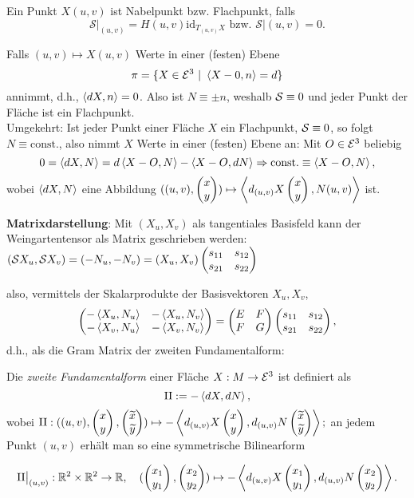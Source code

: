 \begin{remark}
	
	Ein Punkt $X(u,v)$ ist Nabelpunkt bzw. Flachpunkt, falls
	\[ \mathcal{S}\big|_{(u,v)} = H(u,v)\mathrm{id}_{T_{(u,v)}X} \text{ bzw. } \mathcal{S}\big|{(u,v)}=0. \]
	
\end{remark}

\begin{example}\label{Ex:Flachpunkt}
	
	Falls $  (u,v) \mapsto X(u,v) $ Werte in einer (festen) Ebene
		\[ \pi = \{ X \in \mathcal E^3 ~|~ \left \langle X-0,n \right\rangle = d \} \] 
	annimmt, d.h., $ \left \langle dX,n \right\rangle=0 $. Also ist $ N \equiv \pm n $, weshalb $\mathcal S \equiv 0$ und jeder Punkt der Fläche ist ein Flachpunkt.\\
	Umgekehrt: Ist jeder Punkt einer Fläche $ X $ ein Flachpunkt, $ \mathcal S \equiv 0 $, so folgt $ N \equiv \mathrm{const.} $, also nimmt $ X $ Werte in einer (festen) Ebene an: Mit $ O \in \mathcal E^3 $ beliebig \[ 0 = \left \langle dX,N \right\rangle = d\left \langle X-O,N \right\rangle - \left \langle X-O,dN \right\rangle \Rightarrow \mathrm{const.} \equiv \left \langle X-O,N \right\rangle, \] wobei $ \left \langle dX,N \right\rangle $ eine Abbildung $ ((u,v), \begin{pmatrix} x \\ y \end{pmatrix}) \mapsto \left \langle d_{(u,v)}X\begin{pmatrix} x\\y \end{pmatrix},N(u,v) \right\rangle $ ist.

	\textbf{Matrixdarstellung}: Mit $(X_u,X_v)$ als tangentiales Basisfeld kann der Weingartentensor als Matrix geschrieben werden:
	$ (\mathcal S X_u, \mathcal S X_v) = (-N_u, -N_v) = (X_u,X_v) \begin{pmatrix} s_{11} & s_{12} \\ s_{21} & s_{22} \end{pmatrix} $
	
	also, vermittels der Skalarprodukte der Basisvektoren $ X_u,X_v $, 
	\[\begin{pmatrix} -\left \langle X_u,N_u \right\rangle & - \left \langle X_u,N_v \right\rangle \\ - \left \langle X_v,N_u \right\rangle & - \left \langle X_v,N_v \right\rangle  \end{pmatrix} = \begin{pmatrix} E &F \\ F &G \end{pmatrix} \begin{pmatrix} s_{11} & s_{12} \\ s_{21} & s_{22} \end{pmatrix}, \] d.h., als die Gram Matrix der zweiten Fundamentalform:
	
	
\end{example}

\begin{lemma, definition}
	 Die \emph{zweite Fundamentalform} einer Fläche $ X: M \rightarrow \mathcal E^3 $ ist definiert als \[ \mathrm{II} := -\left \langle dX,dN \right\rangle, \] wobei $ \mathrm{II}: ((u,v), \begin{pmatrix} x \\ y \end{pmatrix},\begin{pmatrix} \widetilde{x} \\ \widetilde{y} \end{pmatrix}) \mapsto -\left \langle d_{(u,v)}X \begin{pmatrix} x\\y \end{pmatrix},d_{(u,v)}N \begin{pmatrix} \widetilde{x}\\\widetilde{y} \end{pmatrix} \right\rangle; $
	 an jedem Punkt $ (u,v) $ erhält man so eine symmetrische Bilinearform 
	 
	 \[ \mathrm{II}\big|_{(u,v)}: \mathbb R^2 \times \mathbb R^2 \rightarrow \mathbb R, \quad (\begin{pmatrix} x_1 \\ y_1 \end{pmatrix},\begin{pmatrix} x_2 \\ y_2 \end{pmatrix}) \mapsto - \left \langle d_{(u,v)}X\begin{pmatrix} x_1 \\ y_1 \end{pmatrix},d_{(u,v)}N\begin{pmatrix} x_2 \\ y_2 \end{pmatrix} \right\rangle. \]
	 
\end{lemma, definition}

